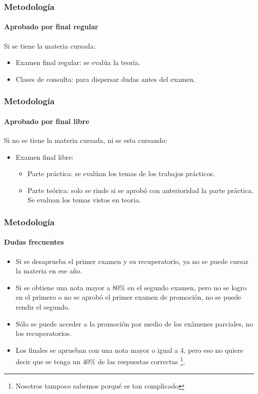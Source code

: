 \documentclass[11pt,a4paper,spanish]{beamer}
\begin{document}
\begin{frame}

    \frametitle{Metodología}
    \framesubtitle{Aprobado por final regular}

Si se tiene la materia cursada:
\begin{itemize}
    \item Examen final regular: se evalúa la teoría.
    \item Clases de consulta: para dispersar dudas antes del examen.
\end{itemize}

\end{frame}

\begin{frame}

    \frametitle{Metodología}
    \framesubtitle{Aprobado por final libre}

Si no se tiene la materia cursada, ni se esta cursando:
\begin{itemize}
    \item Examen final libre:
        \begin{itemize}
            \item Parte práctica: se evalúan los temas de los trabajos
                prácticos.
            \item Parte teórica: solo se rinde si se aprobó con anterioridad
                la parte práctica. Se evaluan los temas vistos en teoria.
        \end{itemize}
\end{itemize}


\end{frame}

\begin{frame}

    \frametitle{Metodología}
    \framesubtitle{Dudas frecuentes}

\begin{itemize}

    \item Si se desaprueba el primer examen y su recuperatorio, ya no se puede
        cursar la materia en ese año.
    \item Si se obtiene una nota mayor a $80\%$ en el segundo examen, pero no
        se logro en el primero o no se aprobó el primer examen de promoción,
        no se puede rendir el segundo.
    \item Sólo se puede acceder a la promoción por medio de los exámenes
        parciales, no los recuperatorios.
    \item Los finales se aprueban con una nota mayor o igual a 4, pero eso no
        quiere decir que se tenga un $40\%$ de las respuestas correctas
        \footnote{\tiny Nosotros tampoco sabemos porqué es tan complicado}.

\end{itemize}

\end{frame}
\end{document}
